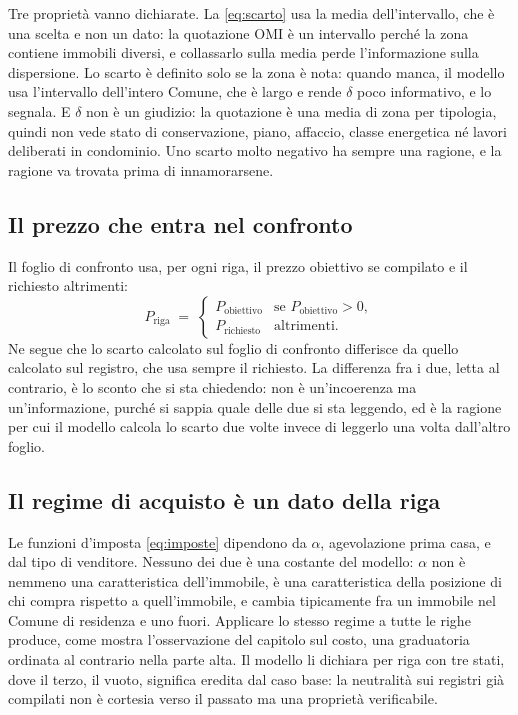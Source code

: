 \documentclass[11pt,a4paper]{article}
\theoremstyle{definition}
\theoremstyle{plain}
\begin{document}
Tre proprietà vanno dichiarate. La \eqref{eq:scarto} usa la media dell'intervallo, che è una scelta e non un dato: la quotazione OMI è un intervallo perché la zona contiene immobili diversi, e collassarlo sulla media perde l'informazione sulla dispersione. Lo scarto è definito solo se la zona è nota: quando manca, il modello usa l'intervallo dell'intero Comune, che è largo e rende $\delta$ poco informativo, e lo segnala. E $\delta$ non è un giudizio: la quotazione è una media di zona per tipologia, quindi non vede stato di conservazione, piano, affaccio, classe energetica né lavori deliberati in condominio. Uno scarto molto negativo ha sempre una ragione, e la ragione va trovata prima di innamorarsene.

\subsection{Il prezzo che entra nel confronto}

Il foglio di confronto usa, per ogni riga, il prezzo obiettivo se compilato e il richiesto altrimenti:
\begin{equation}
P_{\text{riga}} \;=\; \begin{cases} P_{\text{obiettivo}} & \text{se } P_{\text{obiettivo}}>0,\\ P_{\text{richiesto}} & \text{altrimenti.}\end{cases}
\label{eq:prezzo-riga}
\end{equation}
Ne segue che lo scarto calcolato sul foglio di confronto differisce da quello calcolato sul registro, che usa sempre il richiesto. La differenza fra i due, letta al contrario, è lo sconto che si sta chiedendo: non è un'incoerenza ma un'informazione, purché si sappia quale delle due si sta leggendo, ed è la ragione per cui il modello calcola lo scarto due volte invece di leggerlo una volta dall'altro foglio.

\subsection{Il regime di acquisto è un dato della riga}

Le funzioni d'imposta \eqref{eq:imposte} dipendono da $\alpha$, agevolazione prima casa, e dal tipo di venditore. Nessuno dei due è una costante del modello: $\alpha$ non è nemmeno una caratteristica dell'immobile, è una caratteristica della posizione di chi compra rispetto a quell'immobile, e cambia tipicamente fra un immobile nel Comune di residenza e uno fuori. Applicare lo stesso regime a tutte le righe produce, come mostra l'osservazione del capitolo sul costo, una graduatoria ordinata al contrario nella parte alta. Il modello li dichiara per riga con tre stati, dove il terzo, il vuoto, significa eredita dal caso base: la neutralità sui registri già compilati non è cortesia verso il passato ma una proprietà verificabile.
\end{document}
